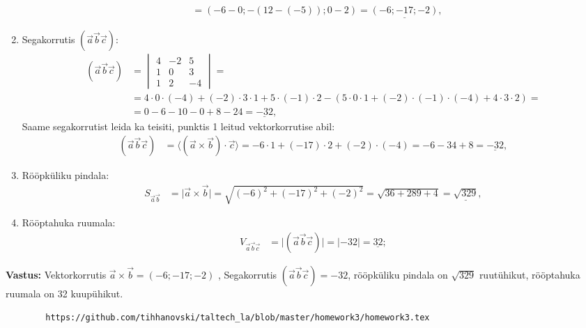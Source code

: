 \documentclass[10pt, a4paper]{article}
\begin{document}
\begin{enumerate}
\begin{align}
                    &= (-6 - 0; -(12 - (-5)); 0 - 2) = \underline{(-6; -17; -2)},
                \end{align}
            \item Segakorrutis $(\vec{a} \vec{b} \vec{c})$:
                \begin{align}
                    \nonumber
                    (\vec{a} \vec{b} \vec{c}) &=
                    \begin{vmatrix}
                        4 & -2 & 5 \\
                        1 & 0 & 3 \\
                        1 & 2 & -4
                    \end{vmatrix} = \\ \nonumber
                    &= 4 \cdot 0 \cdot (-4) + (-2) \cdot 3 \cdot 1 + 5 \cdot (-1) \cdot 2 - (5 \cdot 0 \cdot 1 + (-2) \cdot (-1) \cdot (-4) + 4 \cdot 3 \cdot 2) = \\ \nonumber
                    &= 0 - 6 - 10 - 0 + 8 - 24 = \underline{-32},
                \end{align}
                Saame segakorrutist leida ka teisiti, punktis 1 leitud vektorkorrutise abil:
                \begin{align}
                    \nonumber
                    (\vec{a} \vec{b} \vec{c}) &= \langle (\vec{a} \times \vec{b}) \cdot \vec{c} \rangle = -6 \cdot 1 + (-17) \cdot 2 + (-2) \cdot (-4) = -6 - 34 + 8 = \underline{-32},
                \end{align}
            \item Rööpküliku pindala:
                \begin{align}
                    \nonumber
                    S_{\vec{a}\vec{b}} &= \lvert \vec{a} \times \vec{b} \rvert = \sqrt{(-6)^2 + (-17)^2 + (-2)^2} = \sqrt{36 + 289 + 4} = \underline{\sqrt{329}},
                \end{align}
            \item Rööptahuka ruumala:
                \begin{align}
                    \nonumber
                    V_{\vec{a}\vec{b}\vec{c}} &= \lvert (\vec{a} \vec{b} \vec{c}) \rvert = \lvert -32 \rvert = \underline{32};
                \end{align}
            \end{enumerate}
        \textbf{Vastus: } Vektorkorrutis $\vec{a} \times \vec{b} = (-6; -17; -2)$ , Segakorrutis $(\vec{a} \vec{b} \vec{c}) = -32$, rööpküliku pindala on $\sqrt{329}$ ruutühikut, rööptahuka ruumala on 32 kuupühikut.
    
    \begin{verbatim}
        https://github.com/tihhanovski/taltech_la/blob/master/homework3/homework3.tex
    \end{verbatim}
\end{document}
